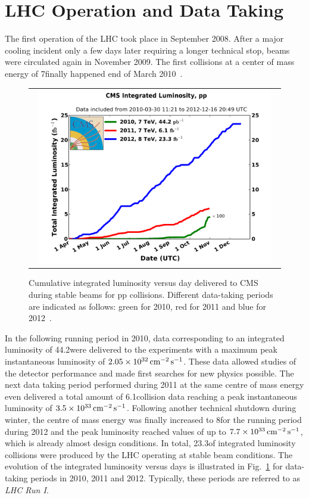 \section{LHC Operation and Data Taking}
\label{sec:data}
The first operation of the LHC took place in September 2008. After a major cooling incident only a few days later requiring a longer technical stop, beams were circulated again in November 2009. The first collisions at a center of mass energy of 7\tev finally happened end of March 2010~\cite{bib:lhcmachineoutreach}. 
\begin{figure}[!t]
  \centering
  \begin{tabular}{c}
    \includegraphics[width=0.95\textwidth]{figures/int_lumi_cumulative_pp_2.pdf}
  \end{tabular}
  \caption{Cumulative integrated luminosity versus day delivered to CMS during stable beams for pp collisions. Different data-taking periods are indicated as follows: green for 2010, red for 2011 and blue for 2012~\cite{bib:lhc:lumi12}.}
  \label{fig:lhc_data}
\end{figure}
In the following running period in 2010, data corresponding to an integrated luminosity of 44.2\pbinv were delivered to the experiments with a maximum peak instantaneous luminosity of $2.05 \times 10^{32} \,\text{cm}^{-2} \,\text{s}^{-1}$. These data allowed studies of the detector performance and made first searches for new physics possible. The next data taking period performed during 2011 at the same centre of mass energy even delivered a total amount of 6.1\fbinv \pp collision data reaching a peak instantaneous luminosity of $3.5 \times 10^{33} \,\text{cm}^{-2} \,\text{s}^{-1}$. Following another technical shutdown during winter, the centre of mass energy was finally increased to 8\tev for the running period during 2012 and the peak luminosity reached values of up to $7.7 \times 10^{33} \,\text{cm}^{-2} \,\text{s}^{-1}$, which is already almost design conditions. In total, 23.3\fbinv of integrated luminosity \pp collisions were produced by the LHC operating at stable beam conditions. The evolution of the integrated luminosity versus days is illustrated in Fig.~\ref{fig:lhc_data} for data-taking periods in 2010, 2011 and 2012. Typically, these periods are referred to as \textit{LHC Run I}. \\
